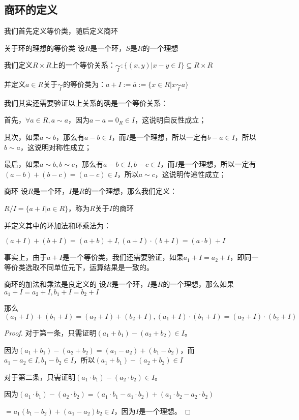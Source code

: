 \documentclass[12pt, a4paper, oneside, UTF8]{ctexbook}
\begin{document}
		\subsection{商环的定义}
			我们首先定义等价类，随后定义商环
			\begin{defn}{关于环的理想的等价类}{}
				设$R$是一个环，$S$是$R$的一个理想
				
				我们定义$R \times R$上的一个等价关系：$\underset{I}{\sim} : \{(x,y) | x-y \in I\} \subseteq R \times R$

				并定义$a \in R$关于$\underset{I}{\sim}$的等价类为：$a +I :=\overline{a} := \{x \in R | x \underset{I}{\sim} a\}$
			\end{defn}
			我们其实还需要验证以上关系的确是一个等价关系：

			首先，$\forall a \in R,a \sim a$，因为$a-a=0_R \in I$，这说明自反性成立；

			其次，如果$a \sim b$，那么有$a-b \in I$，而$I$是一个理想，所以一定有$b-a \in I$，所以$b \sim a$，这说明对称性成立；

			最后，如果$a \sim b,b \sim c$，那么有$a-b \in I,b-c \in I$，而$I$是一个理想，所以一定有$(a-b)+(b-c)=(a-c) \in I$，所以$a \sim c$，这说明传递性成立；
			\begin{defn}{商环}{}
				设$R$是一个环，$I$是$R$的一个理想，那么我们定义：

				$R/I = \{a +I | a \in R\}$，称为$R$关于$I$的商环

				并定义其中的环加法和环乘法为：

				$(a+I)+(b+I)=(a+b)+I,(a+I)\cdot(b+I)=(a\cdot b)+I$
			\end{defn}
			事实上，由于$a+I$是一个等价类，我们还需要验证，如果$a_1+I=a_2+I$，即同一等价类选取不同单位元下，运算结果是一致的。
			\begin{proposition}{商环的加法和乘法是良定义的}{}
				设$R$是一个环，$I$是$R$的一个理想，那么如果$a_1+I=a_2+I,b_1+I=b_2+I$

				那么$(a_1+I)+(b_1+I)=(a_2+I)+(b_2+I),(a_1+I)\cdot (b_1+I)=(a_2+I)\cdot (b_2+I)$
			\end{proposition}
			\begin{proof}
				对于第一条，只需证明$(a_1+b_1)-(a_2+b_2) \in I$。

				因为$(a_1+b_1)-(a_2+b_2)=(a_1-a_2)+(b_1-b_2)$，而$a_1-a_2 \in I,b_1-b_2 \in I$，所以$(a_1+b_1)-(a_2+b_2) \in I$
				
				对于第二条，只需证明$(a_1\cdot b_1)-(a_2\cdot b_2) \in I$。

				因为$(a_1\cdot b_1)-(a_2\cdot b_2)=(a_1\cdot b_1-a_1\cdot b_2)+(a_1\cdot b_2-a_2\cdot b_2)$

				$=a_1(b_1-b_2)+(a_1-a_2)b_2 \in I$，因为$I$是一个理想。
			\end{proof}
\end{document}
